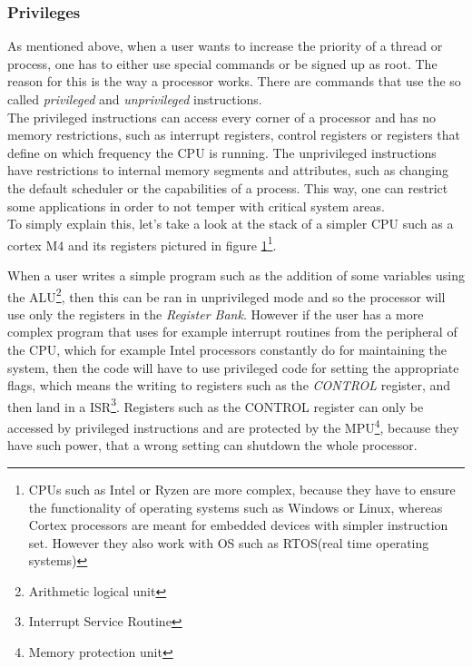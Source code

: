 \subsubsection{Privileges}
As mentioned above, when a user wants to increase the priority of a thread or process, one has to either use special commands or be signed up as root. The reason for this is the way a processor works. There are commands that use the so called \textit{privileged} and \textit{unprivileged} instructions.\\
The privileged instructions can access every corner of a processor and has no memory restrictions, such as interrupt registers, control registers or registers that define on which frequency the CPU is running. The unprivileged instructions have restrictions to internal memory segments and attributes, such as changing the default scheduler or the capabilities of a process. This way, one can restrict some applications in order to not temper with critical system areas.\\
To simply explain this, let's take a look at the stack of a simpler CPU such as a cortex M4 and its registers pictured in figure \ref{cortex_M4_registers}\footnote{CPUs such as Intel or Ryzen are more complex, because they have to ensure the functionality of operating systems such as Windows or Linux, whereas Cortex processors are meant for embedded devices with simpler instruction set. However they also work with OS such as RTOS(real time operating systems)}.
\begin{figure}[!htbp]
	\centering
	\label{cortex_M4_registers}
\end{figure}
When a user writes a simple program such as the addition of some variables using the ALU\footnote{Arithmetic logical unit}, then this can be ran in unprivileged mode and so the processor will use only the registers in the \textit{Register Bank}. However if the user has a more complex program that uses for example interrupt routines from the peripheral of the CPU, which for example Intel processors constantly do for maintaining the system, then the code will have to use privileged code for setting the appropriate flags, which means the writing to registers such as the \textit{CONTROL} register, and then land in a ISR\footnote{Interrupt Service Routine}. Registers such as the CONTROL register can only be accessed by privileged instructions and are protected by the MPU\footnote{Memory protection unit}, because they have such power, that a wrong setting can shutdown the whole processor\cite{cortexM4}.
